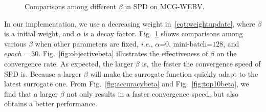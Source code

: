 \documentclass[runningheads]{llncs}
\begin{document}
\begin{figure}[ht!]
\centering
\begin{minipage}{1.0\textwidth}
\caption{Comparisons among different $\beta$ in SPD on MCG-WEBV.}
\label{fig:differentbeta}
\end{minipage}
\end{figure}

In our implementation, we use a decreasing weight in~\eqref{eqt:weightupdate}, where $\beta$ is a initial weight, and $\alpha$ is a decay factor. Fig.~\ref{fig:differentbeta} shows comparisons among various $\beta$ when other parameters are fixed, \emph{i.e.}, $\alpha$=$0$, mini-batch=$128$, and $epoch=30$. Fig.~\ref{fig:objectivebeta} illustrates the effectiveness of $\beta$ on the convergence rate. As expected, the larger $\beta$ is, the faster the convergence speed of SPD is. Because a larger $\beta$ will make the surrogate function quickly adapt to the latest surrogate one. From Fig.~\ref{fig:accuracybeta} and Fig.~\ref{fig:top10beta}, we find that a larger $\beta$ not only results in a faster convergence speed, but also obtains a better performance.
\end{document}
